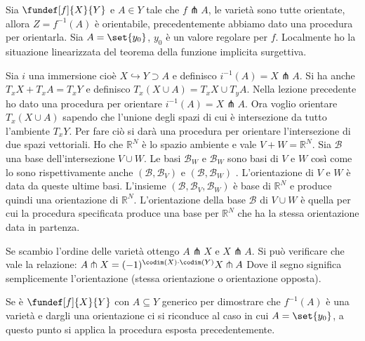 

Sia $\fundef[f]{X}{Y}$ e $A \in Y$ tale che $f \pitchfork A$, le varietà sono tutte orientate, allora $Z = f^{-1}(A)$ è orientabile, precedentemente abbiamo dato una procedura per orientarla.
Sia $A = \set{y_0}$, $y_0$ è un valore regolare per $f$. Localmente ho la situazione linearizzata del teorema della funzione implicita surgettiva.



\newcommand*\base{\mathcal B}

Sia $i$ una immersione cioè $X \hookrightarrow Y \supset A$ e definisco $i^{-1} (A) = X \pitchfork A$. Si ha anche $T_{x}X + T_{x}A = T_{x}Y$ e definisco $T_{x}(X \cup A) = T_{x}X \cup T_{y}A$. 
Nella lezione precedente ho dato una procedura per orientare $i^{-1} (A) = X \pitchfork A$. Ora voglio orientare  $T_{x}(X \cup A)$ sapendo che l'unione degli spazi di cui è intersezione da tutto l'ambiente $T_{x}Y$. Per fare ciò si darà una procedura per orientare l'intersezione di due spazi vettoriali.
Ho che $\mathbb{R}^{N}$ è lo spazio ambiente e vale $V+W = \mathbb{R}^{N}$. Sia $\base$ una base dell'intersezione $V \cup W $. Le basi $\base_{W}$ e $\base_{W}$ sono basi di $V$ e $W$ così come lo sono rispettivamente anche $(\base, \base_{V})$ e  $(\base, \base_{W})$
. L'orientazione di $V$ e $W$ è data da queste ultime basi. L'insieme $(\base, \base_V, \base_W)$ è base di $\mathbb{R}^{N}$ e produce quindi una orientazione di $\mathbb{R}^{N}$.
L'orientazione della base $\base$ di $V \cup W$ è quella per cui la procedura specificata produce una base per $\mathbb{R}^{N}$ che ha la stessa orientazione data in partenza.


\begin{oss}
 Se scambio l'ordine delle varietà ottengo $A \pitchfork X$ e $X \pitchfork A$. Si può verificare che vale la relazione: $ A \pitchfork X = (-1)^{\codim(X) \cdot \codim(Y)} X \pitchfork A$
 Dove il segno significa semplicemente l'orientazione (stessa orientazione o orientazione opposta).
\end{oss}

Se è $\fundef[f]{X}{Y}$ con $A \subseteq Y$ generico per dimostrare che $f^{-1}(A)$ è una varietà e dargli una orientazione
ci si riconduce al caso in cui $A = \set{y_{0}}$, a questo punto si applica la procedura esposta precedentemente.

